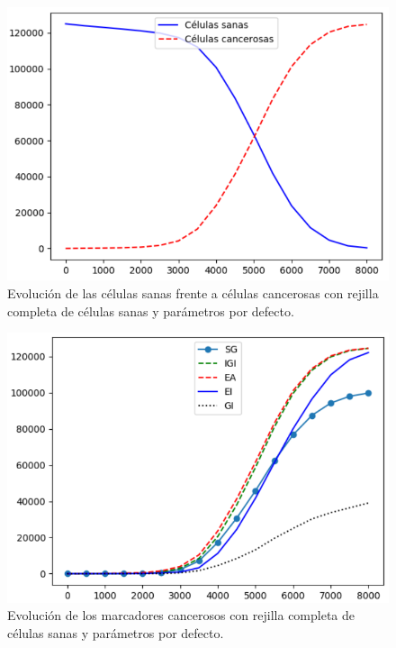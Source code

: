 \begin{figure}[h]
\centering
\includegraphics[scale=0.8]{figures/experiments/exp5/healthvscarcino}
\caption{Evolución de las células sanas frente a células cancerosas con rejilla completa de células sanas y parámetros por defecto.}
\end{figure}

\begin{figure}[h]
\centering
\includegraphics[scale=0.8]{figures/experiments/exp5/mutations}
\caption{Evolución de los marcadores cancerosos con rejilla completa de células sanas y parámetros por defecto.}
\end{figure}

